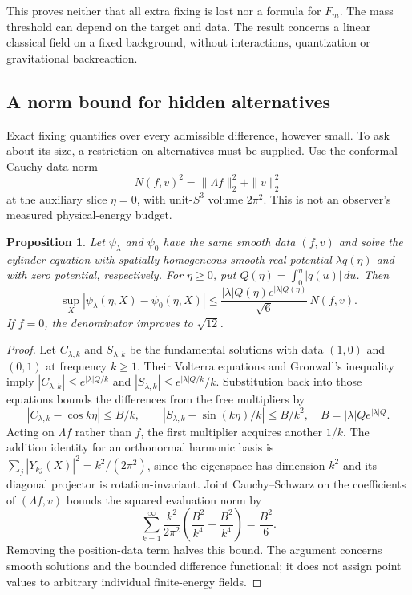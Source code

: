 \documentclass[11pt]{article}
\newtheorem{proposition}[theorem]{Proposition}
\theoremstyle{definition}
\begin{document}
This proves neither that all extra fixing is lost nor a formula for $F_m$.
The mass threshold can depend on the target and data. The result concerns a
linear classical field on a fixed background, without interactions,
quantization or gravitational backreaction.

\subsection{A norm bound for hidden alternatives}

Exact fixing quantifies over every admissible difference, however small.
To ask about its size, a restriction on alternatives must be supplied. Use
the conformal Cauchy-data norm
\[
 N(f,v)^2=\|\Lambda f\|_2^2+\|v\|_2^2
\]
at the auxiliary slice $\eta=0$, with unit-$S^3$ volume $2\pi^2$.
This is not an observer's measured physical-energy budget.

\begin{proposition}\label{prop:norm}
Let $\psi_\lambda$ and $\psi_0$ have the same smooth data $(f,v)$ and solve
the cylinder equation with spatially homogeneous smooth real potential
$\lambda q(\eta)$ and with zero potential, respectively. For $\eta\ge0$, put
$Q(\eta)=\int_0^\eta |q(u)|\,du$. Then
\begin{equation}\label{eq:norm}
 \sup_X|\psi_\lambda(\eta,X)-\psi_0(\eta,X)|
 \le \frac{|\lambda|Q(\eta)e^{|\lambda|Q(\eta)}}{\sqrt6}\,N(f,v).
\end{equation}
If $f=0$, the denominator improves to $\sqrt{12}$.
\end{proposition}

\begin{proof}
Let $C_{\lambda,k}$ and $S_{\lambda,k}$ be the fundamental solutions with
data $(1,0)$ and $(0,1)$ at frequency $k\ge1$. Their Volterra equations and
Gronwall's inequality imply
$|C_{\lambda,k}|\le e^{|\lambda|Q/k}$ and
$|S_{\lambda,k}|\le e^{|\lambda|Q/k}/k$. Substitution back into those
equations bounds the differences from the free multipliers by
\[
 |C_{\lambda,k}-\cos k\eta|\le B/k,\qquad
 |S_{\lambda,k}-\sin(k\eta)/k|\le B/k^2,
 \quad B=|\lambda|Qe^{|\lambda|Q}.
\]
Acting on $\Lambda f$ rather than $f$, the first multiplier acquires another
$1/k$. The addition identity for an orthonormal harmonic basis is
$\sum_j|Y_{kj}(X)|^2=k^2/(2\pi^2)$, since the eigenspace has dimension
$k^2$ and its diagonal projector is rotation-invariant. Joint
Cauchy--Schwarz on the coefficients of $(\Lambda f,v)$ bounds the squared
evaluation norm by
\[
 \sum_{k=1}^\infty\frac{k^2}{2\pi^2}
       \left(\frac{B^2}{k^4}+\frac{B^2}{k^4}\right)
 =\frac{B^2}{6}.
\]
Removing the position-data term halves this bound. The argument concerns
smooth solutions and the bounded difference functional; it does not assign
point values to arbitrary individual finite-energy fields.
\end{proof}
\end{document}
